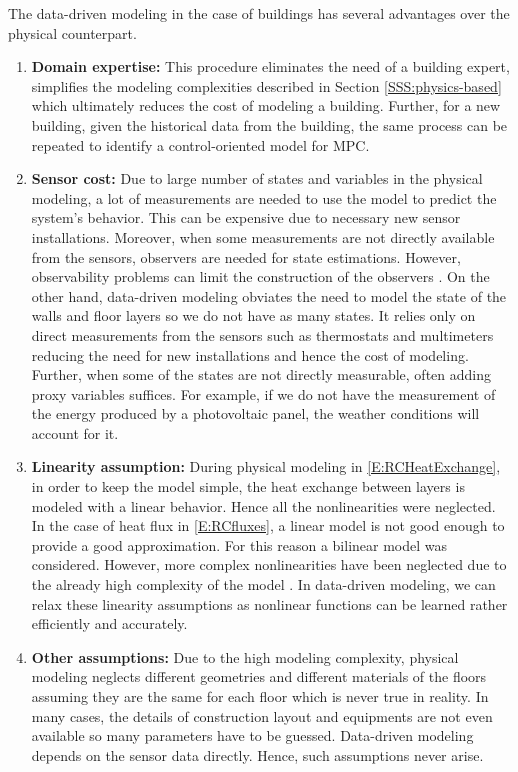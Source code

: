The data-driven modeling in the case of buildings has several advantages over the physical counterpart.
\begin{enumerate}
	
	\item \textbf{Domain expertise:} 
	This procedure eliminates the need of a building expert, simplifies the modeling complexities described in Section \ref{SSS:physics-based} which ultimately reduces the cost of modeling a building. Further, for a new building, given the historical data from the building, the same process can be repeated to identify a control-oriented model for MPC.
	
	\item \textbf{Sensor cost:}
	Due to large number of states and variables in the physical modeling, a lot of measurements are needed to use the model to predict the system's behavior.
	This can be expensive due to necessary new sensor installations.
	Moreover, when some measurements are not directly available from the sensors, observers are needed for state estimations.
	However, observability problems can limit the construction of the observers \cite{Dorf2011MCS}. 
	On the other hand, data-driven modeling obviates the need to model the state of the walls and floor layers so we do not have as many states.
	It relies only on direct measurements from the sensors such as thermostats and multimeters reducing the need for new installations and hence the cost of modeling.
	Further, when some of the states are not directly measurable, often adding proxy variables suffices. 
	For example, if we do not have the measurement of the energy produced by a photovoltaic panel, the weather conditions will account for it.
	
	\item \textbf{Linearity assumption:} 
	During physical modeling in \eqref{E:RCHeatExchange}, in order to keep the model simple, the heat exchange between layers is modeled with a linear behavior. 
	Hence all the nonlinearities were neglected.
	In the case of heat flux in \eqref{E:RCfluxes}, a linear model is not good enough to provide a good approximation. For this reason a bilinear model was considered.
	However, more complex nonlinearities have been neglected due to the already high complexity of the model \cite{Sturzenegger2016}. 
	In data-driven modeling, we can relax these linearity assumptions as nonlinear functions can be learned rather efficiently and accurately.

	\item \textbf{Other assumptions:} 
	Due to the high modeling complexity, physical modeling neglects different geometries and different materials of the floors assuming they are the same for each floor which is never true in reality.
	In many cases, the details of construction layout and equipments are not even available so many parameters have to be guessed.
	Data-driven modeling depends on the sensor data directly. 
	Hence, such assumptions never arise.
	
\end{enumerate}

